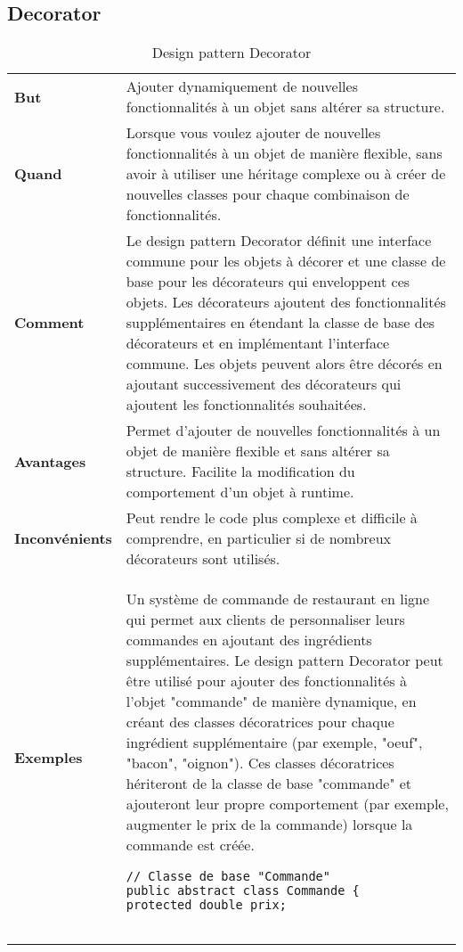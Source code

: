 \subsection{Decorator}
\begin{table}[H]
\caption{Design pattern Decorator}
\label{tbl:design_pattern_decorator}
\begin{adjustbox}{max width=\textwidth}
\begin{tabular}{l|p{\textwidth}}
\toprule
\textbf{But} & Ajouter dynamiquement de nouvelles fonctionnalités à un objet sans altérer sa structure.\\
\cmidrule(lr){1-2}
\textbf{Quand} & Lorsque vous voulez ajouter de nouvelles fonctionnalités à un objet de manière flexible, sans avoir à utiliser une héritage complexe ou à créer de nouvelles classes pour chaque combinaison de fonctionnalités.\\
\cmidrule(lr){1-2}
\textbf{Comment} & Le design pattern Decorator définit une interface commune pour les objets à décorer et une classe de base pour les décorateurs qui enveloppent ces objets. Les décorateurs ajoutent des fonctionnalités supplémentaires en étendant la classe de base des décorateurs et en implémentant l'interface commune. Les objets peuvent alors être décorés en ajoutant successivement des décorateurs qui ajoutent les fonctionnalités souhaitées.\\
\cmidrule(lr){1-2}
\textbf{Avantages} & Permet d'ajouter de nouvelles fonctionnalités à un objet de manière flexible et sans altérer sa structure. Facilite la modification du comportement d'un objet à runtime.\\
\cmidrule(lr){1-2}
\textbf{Inconvénients} & Peut rendre le code plus complexe et difficile à comprendre, en particulier si de nombreux décorateurs sont utilisés.\\
\cmidrule(lr){1-2}
\textbf{Exemples} & 
\hspace{4mm}
\begin{minipage}[tl]{0.5\textwidth}
\begin{minipage}[t]{1\textwidth}
Un système de commande de restaurant en ligne qui permet aux clients de personnaliser leurs commandes en ajoutant des ingrédients supplémentaires. Le design pattern Decorator peut être utilisé pour ajouter des fonctionnalités à l'objet "commande" de manière dynamique, en créant des classes décoratrices pour chaque ingrédient supplémentaire (par exemple, "oeuf", "bacon", "oignon"). Ces classes décoratrices hériteront de la classe de base "commande" et ajouteront leur propre comportement (par exemple, augmenter le prix de la commande) lorsque la commande est créée.
\end{minipage}
\begin{minipage}[b]{1\textwidth}
\begin{lstlisting}[style=monstyle]
// Classe de base "Commande"
public abstract class Commande {
protected double prix;


\end{lstlisting}
\end{minipage}
\end{minipage}
\end{tabular}
\end{adjustbox}
\end{table}
